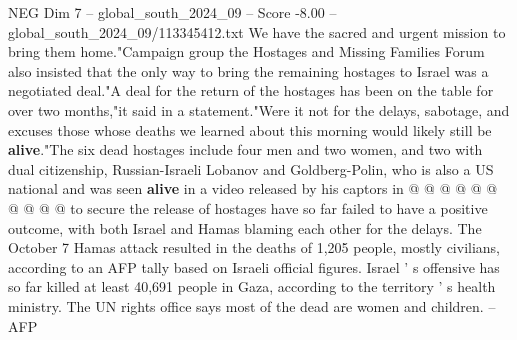 \begin{textsample}{NEG Dim 7 – global\_south\_2024\_09 – Score -8.00 – global\_south\_2024\_09/113345412.txt}
We have the sacred and urgent mission to bring them home."Campaign group the Hostages and Missing Families Forum also insisted that the only way to bring the remaining hostages to Israel was a negotiated deal."A deal for the return of the hostages has been on the table for over two months,"it said in a statement."Were it not for the delays, sabotage, and excuses those whose deaths we learned about this morning would likely still be \textbf{alive}."The six dead hostages include four men and two women, and two with dual citizenship, Russian-Israeli Lobanov and Goldberg-Polin, who is also a US national and was seen \textbf{alive} in a video released by his captors in @ @ @ @ @ @ @ @ @ @ to secure the release of hostages have so far failed to have a positive outcome, with both Israel and Hamas blaming each other for the delays.
The October 7 Hamas attack resulted in the deaths of 1,205 people, mostly civilians, according to an AFP tally based on Israeli official figures.
Israel ' s offensive has so far killed at least 40,691 people in Gaza, according to the territory ' s health ministry.
The UN rights office says most of the dead are women and children. -- AFP

\end{textsample}
